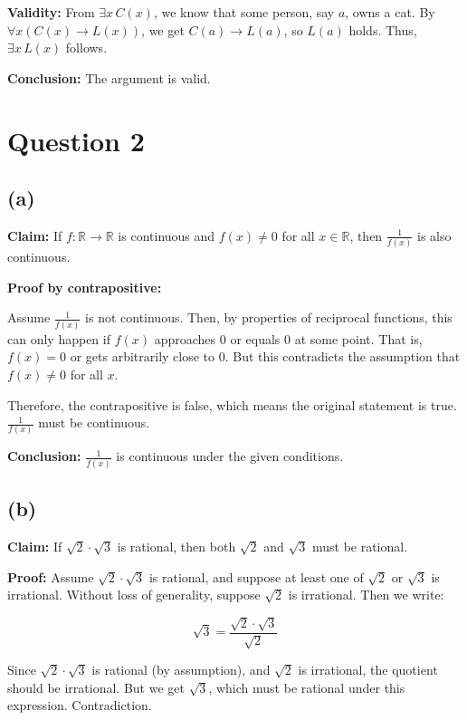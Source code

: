 \documentclass{article}
\begin{document}
\textbf{Validity:}  
From \(\exists x \, C(x)\), we know that some person, say \(a\), owns a cat.  
By \(\forall x (C(x) \rightarrow L(x))\), we get \(C(a) \rightarrow L(a)\), so \(L(a)\) holds.  
Thus, \(\exists x \, L(x)\) follows.  

\textbf{Conclusion:} The argument is valid.

\section*{Question 2}

\subsection*{(a)}

\textbf{Claim:} If \(f : \mathbb{R} \to \mathbb{R}\) is continuous and \(f(x) \ne 0\) for all \(x \in \mathbb{R}\), then \(\frac{1}{f(x)}\) is also continuous.

\textbf{Proof by contrapositive:}

Assume \(\frac{1}{f(x)}\) is not continuous.  
Then, by properties of reciprocal functions, this can only happen if \(f(x)\) approaches 0 or equals 0 at some point.  
That is, \(f(x) = 0\) or gets arbitrarily close to 0.  
But this contradicts the assumption that \(f(x) \ne 0\) for all \(x\).  

Therefore, the contrapositive is false, which means the original statement is true.  
\(\frac{1}{f(x)}\) must be continuous.

\textbf{Conclusion:} \(\frac{1}{f(x)}\) is continuous under the given conditions.

\subsection*{(b)}

\textbf{Claim:} If \(\sqrt{2} \cdot \sqrt{3}\) is rational, then both \(\sqrt{2}\) and \(\sqrt{3}\) must be rational.

\textbf{Proof:}  
Assume \(\sqrt{2} \cdot \sqrt{3}\) is rational, and suppose at least one of \(\sqrt{2}\) or \(\sqrt{3}\) is irrational.  
Without loss of generality, suppose \(\sqrt{2}\) is irrational.  
Then we write:

\[
\sqrt{3} = \frac{\sqrt{2} \cdot \sqrt{3}}{\sqrt{2}}
\]

Since \(\sqrt{2} \cdot \sqrt{3}\) is rational (by assumption), and \(\sqrt{2}\) is irrational, the quotient should be irrational.  
But we get \(\sqrt{3}\), which must be rational under this expression.  
Contradiction.
\end{document}

